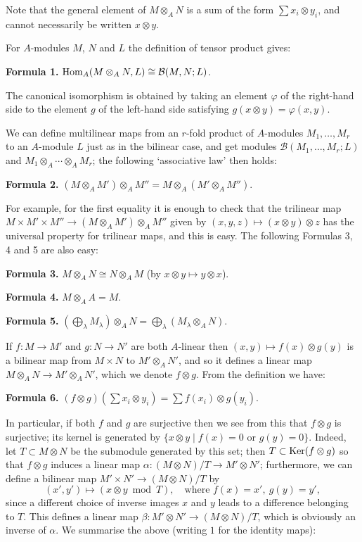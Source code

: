 Note that the general element of $M \otimes_A N$ is a sum of the form $\sum x_i \otimes y_i$,
and cannot necessarily be written $x \otimes y$.

For $A$-modules $M$, $N$ and $L$ the definition of tensor product gives:

\textbf{Formula 1.} $\operatorname{Hom}_A(M \otimes_A N, L) \cong \mathcal{B}(M, N; L)$.

The canonical isomorphism is obtained by taking an element $\varphi$ of the
right-hand side to the element $g$ of the left-hand side satisfying
$g(x \otimes y) = \varphi(x, y)$.

We can define multilinear maps from an $r$-fold product of $A$-modules
$M_1, \ldots, M_r$ to an $A$-module $L$ just as in the bilinear case, and get modules
$\mathcal{B}(M_1, \ldots, M_r; L)$ and $M_1 \otimes_A \cdots \otimes_A M_r$; the following `associative
law' then holds:

\textbf{Formula 2.} $(M \otimes_A M') \otimes_A M'' = M \otimes_A (M' \otimes_A M'')$.

For example, for the first equality it is enough to check that the trilinear map
$M \times M' \times M'' \to (M \otimes_A M') \otimes_A M''$ given by
$(x, y, z) \mapsto (x \otimes y) \otimes z$ has the universal property for trilinear maps, and this
is easy. The following Formulas 3, 4 and 5 are also easy:

\textbf{Formula 3.} $M \otimes_A N \cong N \otimes_A M$ \quad (by $x \otimes y \mapsto y \otimes x$).

\textbf{Formula 4.} $M \otimes_A A = M$.

\textbf{Formula 5.} $(\bigoplus_\lambda M_\lambda) \otimes_A N = \bigoplus_\lambda(M_\lambda \otimes_A N)$.

If $f\colon M \to M'$ and $g\colon N \to N'$ are both $A$-linear then
$(x, y) \mapsto f(x) \otimes g(y)$ is a bilinear map from $M \times N$ to $M' \otimes_A N'$, and so it
defines a linear map $M \otimes_A N \to M' \otimes_A N'$, which we denote $f \otimes g$. From
the definition we have:

\textbf{Formula 6.} $(f \otimes g)(\sum x_i \otimes y_i) = \sum f(x_i) \otimes g(y_i)$.

In particular, if both $f$ and $g$ are surjective then we see from this that
$f \otimes g$ is surjective; its kernel is generated by
$\{x \otimes y \mid f(x) = 0 \text{ or } g(y) = 0\}$. Indeed, let $T \subset M \otimes N$ be the submodule
generated by this set; then $T \subset \operatorname{Ker}(f \otimes g)$ so that $f \otimes g$ induces a linear
map $\alpha\colon (M \otimes N)/T \to M' \otimes N'$; furthermore, we can define a bilinear map
$M' \times N' \to (M \otimes N)/T$ by
\[
  (x', y') \mapsto (x \otimes y \bmod T), \quad \text{where } f(x) = x',\ g(y) = y',
\]
since a different choice of inverse images $x$ and $y$ leads to a difference
belonging to $T$. This defines a linear map $\beta\colon M' \otimes N' \to (M \otimes N)/T$,
which is obviously an inverse of $\alpha$. We summarise the above (writing $1$ for
the identity maps):

